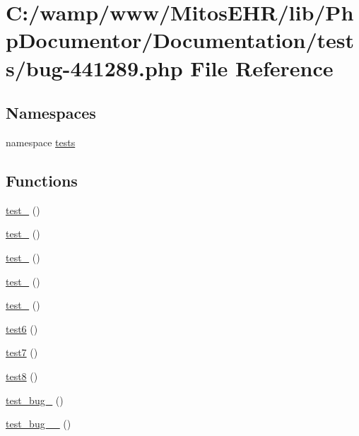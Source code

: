 \hypertarget{bug-441289_8php}{\section{\-C\-:/wamp/www/\-Mitos\-E\-H\-R/lib/\-Php\-Documentor/\-Documentation/tests/bug-\/441289.php \-File \-Reference}
\label{bug-441289_8php}
}
\subsection*{\-Namespaces}
\begin{DoxyCompactItemize}
\item 
namespace \hyperlink{namespacetests}{tests}
\end{DoxyCompactItemize}
\subsection*{\-Functions}
\begin{DoxyCompactItemize}
\item 
\hyperlink{bug-441289_8php_a533c2518af4a0718a07847f1cd3f8cb3}{test\-\_} ()
\item 
\hyperlink{bug-441289_8php_a6d5b8e895875991ba7154ed7f319e516}{test\-\_} ()
\item 
\hyperlink{bug-441289_8php_a4c61d22a1e8e1771b79c1f5223ba1881}{test\-\_} ()
\item 
\hyperlink{bug-441289_8php_aa2e027ad905707a3fdee0bdf743b6f6d}{test\-\_} ()
\item 
\hyperlink{bug-441289_8php_a3ad888c50c196a6d16d5eef256bb3df6}{test\-\_} ()
\item 
\hyperlink{bug-441289_8php_af5d45a8517653c587ac8545485a10445}{test6} ()
\item 
\hyperlink{bug-441289_8php_ad016b9ada727fab06dc0b1e15b59e526}{test7} ()
\item 
\hyperlink{bug-441289_8php_a4ae13d043ba6de9218bcb0c21f6259ff}{test8} ()
\item 
\hyperlink{bug-441289_8php_afe539f2b31904cc003607d39fccbee13}{test\-\_\-bug\-\_} ()
\item 
\hyperlink{bug-441289_8php_a4447d204581471d3445c36211acfa3f7}{test\-\_\-bug\-\_\-\_} ()
\end{DoxyCompactItemize}


